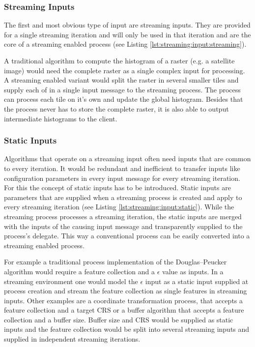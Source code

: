 		\subsubsection{Streaming Inputs}
			\label{sec:streaming:input:streaming}
			The first and most obvious type of input are streaming inputs. They are provided for a single streaming iteration and will only be used in that iteration and are the core of a streaming enabled process (see Listing \ref{lst:streaming:input:streaming}).

			A traditional algorithm to compute the histogram of a raster (e.g. a satellite image) would need the complete raster as a single complex input for processing. A streaming enabled variant would split the raster in several smaller tiles and supply each of in a single input message to the streaming process. The process can process each tile on it's own and update the global histogram. Besides that the process never has to store the complete raster, it is also able to output intermediate histograms to the client.

		\subsubsection{Static Inputs}
			\label{sec:stream:input:static}
			Algorithms that operate on a streaming input often need inputs that are common to every iteration. It would be redundant and inefficient to transfer inputs like configuration parameters in every input message for every streaming iteration. For this the concept of static inputs has to be introduced. Static inputs are parameters that are supplied when a streaming process is created and apply to every streaming iteration (see Listing \ref{lst:streaming:input:static}). While the streaming process processes a streaming iteration, the static inputs are merged with the inputs of the causing input message and transparently supplied to the process's delegate. This way a conventional process can be easily converted into a streaming enabled process.

			For example a traditional process implementation of the Douglas–Peucker algorithm \citep{douglas1973algorithms} would require a feature collection and a $\epsilon$ value as inputs. In a streaming environment one would model the $\epsilon$ input as a static input supplied at process creation and stream the feature collection as single features in streaming inputs. Other examples are a coordinate transformation process, that accepts a feature collection and a target \ac{CRS} or a buffer algorithm that accepts a feature collection and a buffer size. Buffer size and \ac{CRS} would be supplied as static inputs and the feature collection would be split into several streaming inputs and supplied in independent streaming iterations.

